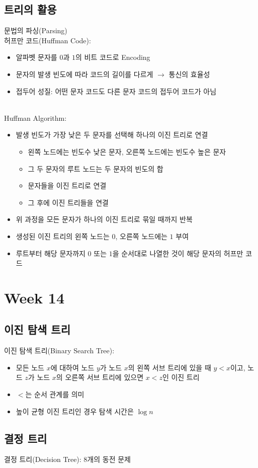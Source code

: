 \subsection{트리의 활용}
문법의 파싱(Parsing)\\
허프만 코드(Huffman Code):
\begin{itemize}
    \item 알파벳 문자를 $0$과 $1$의 비트 코드로 Encoding
    \item 문자의 발생 빈도에 따라 코드의 길이를 다르게 $\to$ 통신의 효율성
    \item 접두어 성질: 어떤 문자 코드도 다른 문자 코드의 접두어 코드가 아님
\end{itemize}\phantom{}\\
Huffman Algorithm:
\begin{itemize}
    \item 발생 빈도가 가장 낮은 두 문자를 선택해 하나의 이진 트리로 연결
    \begin{itemize}
        \item 왼쪽 노드에는 빈도수 낮은 문자, 오른쪽 노드에는 빈도수 높은 문자
        \item 그 두 문자의 루트 노드는 두 문자의 빈도의 합
        \item 문자들을 이진 트리로 연결
        \item 그 후에 이진 트리들을 연결
    \end{itemize}
    \item 위 과정을 모든 문자가 하나의 이진 트리로 묶일 때까지 반복
    \item 생성된 이진 트리의 왼쪽 노드는 $0$, 오른쪽 노드에는 $1$ 부여
    \item 루트부터 해당 문자까지 $0$ 또는 $1$을 순서대로 나열한 것이 해당 문자의 허프만 코드 
\end{itemize}

\newpage 
\section{Week 14}
\subsection{이진 탐색 트리}
이진 탐색 트리(Binary Search Tree):
\begin{itemize}
    \item 모든 노드 $x$에 대하여 노드 $y$가 노드 $x$의 왼쪽 서브 트리에 있을 때 $y < x$이고,
    노드 $z$가 노드 $x$의 오른쪽 서브 트리에 있으면 $x < z$인 이진 트리
    \item $<$는 순서 관계를 의미
    \item 높이 균형 이진 트리인 경우 탐색 시간은 $\log n$
\end{itemize}

\subsection{결정 트리}
결정 트리(Decision Tree): 8개의 동전 문제




